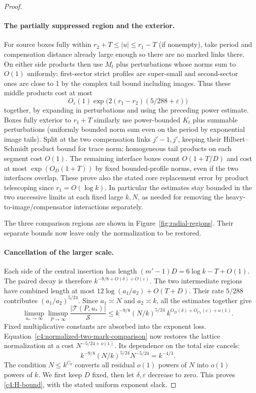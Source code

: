 \begin{proof}
\paragraph{The partially suppressed region and the exterior.}
For source boxes fully within \(r_2+T\le|u|\le r_1-T\) (if nonempty), take period and compensation distance already large enough so there are no marked links there. On either side products then use \(M_t\) plus perturbations whose norms sum to \(O(1)\) uniformly: first-sector strict profiles are super-small and second-sector ones are close to 1 by the complex tail bound including images. Thus these middle products cost at most
\[
                 O_\varepsilon(1)\exp\!\big(2(r_1-r_2)(5/288+\varepsilon)\big)
\]
together, by expanding in perturbations and using the preceding power estimate. Boxes fully exterior to \(r_1+T\) similarly use power-bounded \(K_t\) plus summable perturbations (uniformly bounded norm sum even on the period by exponential image tails). Split at the two compensation links \(j'-1,j'\), keeping their Hilbert--Schmidt product bound for trace norm; homogeneous tail products on each segment cost \(O(1)\). The remaining interface boxes count \(O(1+T/D)\) and cost at most \(\exp(O_D(1+T))\) by fixed bounded-profile norms, even if the two interfaces overlap. These prove also the stated core replacement error by product telescoping since \(r_1=O(\log k)\). In particular the estimates stay bounded in the two successive limits at each fixed large \(k,N\), as needed for removing the heavy-to-image/compensator interactions separately.

The three comparison regions are shown in Figure~\ref{fig:radial-regions}. Their separate bounds now leave only the normalization to be restored.



\paragraph{Cancellation of the larger scale.}
Each side of the central insertion has length
\((m'-1)D=6\log k-T+O(1)\).
The paired decay is therefore \(k^{-9/8+O(\delta)+O(\varepsilon)}\).
The two intermediate regions have combined length at most
\(12\log(a_1/a_2)+O(T+D)\).  Their rate \(5/288\) contributes
\((a_1/a_2)^{5/24}\).  Since \(a_1\asymp N\) and
\(a_2\asymp k\), all the estimates together give
\[
 \limsup_{u_*\to\infty}\limsup_{P\to\infty}
      \frac{|\mathcal T(P,u_*)|}{\mathcal S}
 \le k^{-9/8}(N/k)^{5/24}\ k^{O_D(\delta)+O_{C_0}(\varepsilon)+o(1)}.
\]
Fixed multiplicative constants are absorbed into the exponent loss.
Equation~\eqref{c4:normalized-two-mark-comparison} now restores the lattice normalization at a cost
\(N^{-5/24+o(1)}\).  Its dependence on the total size cancels:
\[
 k^{-9/8}(N/k)^{5/24}N^{-5/24}=k^{-4/3}.
\]
The condition \(N\le k^{C_0}\) converts all residual \(o(1)\) powers of
\(N\) into \(o(1)\) powers of \(k\).  We first keep \(D\) fixed, then
let \(\delta,\varepsilon\) decrease to zero.  This proves
\eqref{c4:H-bound}, with the stated uniform exponent slack.
\end{proof}
